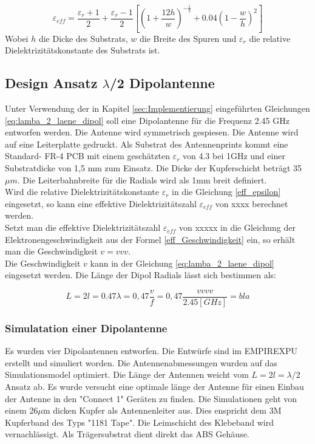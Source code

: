 \begin{equation}\label{eff_epsilon}
\varepsilon_{eff}=\dfrac{\varepsilon_r+1}{2}+\dfrac{\varepsilon_r-1}{2}\left[\left(1+\dfrac{12h}{w}\right)^{-\frac{1}{2}}+0.04\left(1-\dfrac{w}{h}\right)^{2}\right]
\end{equation}
Wobei $h$ die Dicke des Substrats, $w$ die Breite des Spuren und  $\varepsilon_{r}$ die relative Dielektrizitätskonstante des Substrats ist. 

\subsection{Design Ansatz $\lambda$/2 Dipolantenne}  
Unter Verwendung der in Kapitel \ref{sec:Implementierung} eingeführten Gleichungen \ref{eq:lamba_2_laene_dipol} soll eine Dipolantenne für die Frequenz 2.45 GHz entworfen werden. Die Antenne wird symmetrisch gespiesen. Die Antenne wird auf eine Leiterplatte gedruckt. Als Substrat des Antennenprints kommt eine Standard- FR-4 PCB mit einem geschätzten  $\varepsilon_r $ von 4.3 bei 1GHz und einer Substratdicke von 1,5 mm  zum Einsatz. Die Dicke der Kupferschicht beträgt 35 $\mu m$. Die Leiterbahnbreite für die Radials wird als 1mm breit definiert.\\

Wird die relative Dielektrizitätskonstante $\varepsilon_{r}$ in die Gleichung \ref{eff_epsilon} eingesetzt, so kann eine effektive Dielektrizitätszahl $\varepsilon_{eff}$  von xxxx berechnet werden.\\

Setzt man die effektive Dielektrizitätszahl $\varepsilon_{eff}$ von xxxxx  in die Gleichung der Elektronengeschwindigkeit aus der Formel \ref{eff_Geschwindigkeit} ein, so erhält man die Geschwindigkeit $v=vvv$. \\
Die Geschwindigkeit $v$  kann in der  Gleichung \ref{eq:lamba_2_laene_dipol} eingesetzt werden. Die Länge der Dipol Radials lässt sich bestimmen als:

\begin{equation}\label{eq:lamba_2_laene_dipol}
L=2l = 0.47 \lambda= 0,47 \dfrac{v}{f}=0,47 \dfrac{vvvv}{2.45[GHz]}=bla
\end{equation} 
\subsubsection{Simulatation einer Dipolantenne}
Es wurden vier Dipolantennen entworfen. Die Entwürfe sind im EMPIREXPU erstellt und simuliert worden. Die Antennenabmessungen wurden auf das Simulationsmodel optimiert. Die Länge der Antennen weicht vom $L=2l=\lambda/2$ Ansatz ab. Es wurde versucht eine optimale länge der Antenne für einen Einbau der Antenne in den "Connect 1" Geräten zu finden. Die Simulationen geht von einem 26$\mu$m dicken Kupfer als Antennenleiter aus. Dies enspricht dem 3M Kupferband des Typs "1181 Tape". Die Leimschicht des Klebeband wird vernachlässigt. Als Trägersubstrat dient direkt das ABS Gehäuse\cite{Kupferband}.
